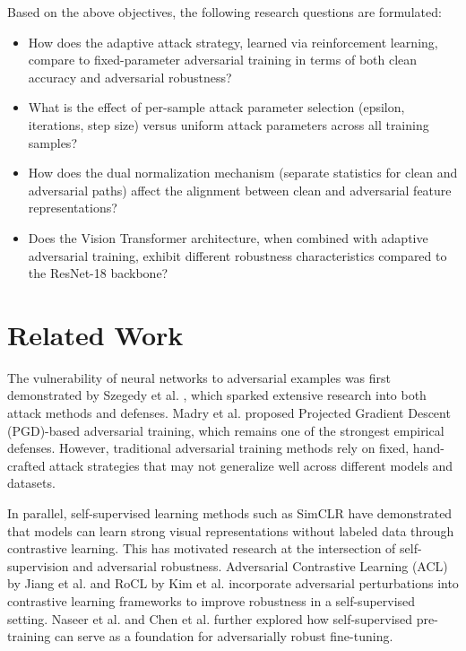 \documentclass[conference]{IEEEtran}
\begin{document}
Based on the above objectives, the following research questions are formulated:

\begin{itemize}
    \item How does the adaptive attack strategy, learned via reinforcement learning, compare to fixed-parameter adversarial training in terms of both clean accuracy and adversarial robustness?

    \item What is the effect of per-sample attack parameter selection (epsilon, iterations, step size) versus uniform attack parameters across all training samples?

    \item How does the dual normalization mechanism (separate statistics for clean and adversarial paths) affect the alignment between clean and adversarial feature representations?

    \item Does the Vision Transformer architecture, when combined with adaptive adversarial training, exhibit different robustness characteristics compared to the ResNet-18 backbone?
\end{itemize}

\section{Related Work}

The vulnerability of neural networks to adversarial examples was first demonstrated by Szegedy et al. \cite{b7}, which sparked extensive research into both attack methods and defenses. Madry et al. \cite{b8} proposed Projected Gradient Descent (PGD)-based adversarial training, which remains one of the strongest empirical defenses. However, traditional adversarial training methods rely on fixed, hand-crafted attack strategies that may not generalize well across different models and datasets.

In parallel, self-supervised learning methods such as SimCLR \cite{b9} have demonstrated that models can learn strong visual representations without labeled data through contrastive learning. This has motivated research at the intersection of self-supervision and adversarial robustness. Adversarial Contrastive Learning (ACL) by Jiang et al. \cite{b4} and RoCL by Kim et al. \cite{b2} incorporate adversarial perturbations into contrastive learning frameworks to improve robustness in a self-supervised setting. Naseer et al. \cite{b1} and Chen et al. \cite{b3} further explored how self-supervised pre-training can serve as a foundation for adversarially robust fine-tuning.
\end{document}
